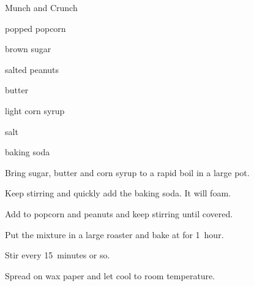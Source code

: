 \begin{recipe}{Munch and Crunch}{}{}

\begin{ingredients}
\item {}popped popcorn
\item {} brown sugar
\item \C{1 \half} salted peanuts
\item {} butter
\item \C{\half} light corn syrup
\item {} salt
\item \tp{\half} baking soda
\end{ingredients}

\begin{directions}
\item Bring sugar, butter and corn syrup to a rapid boil in a large pot.
\item Keep stirring and quickly add the baking soda. It will foam.
\item Add to popcorn and peanuts and keep stirring until covered.
\item Put the mixture in a large roaster and bake at  for 1~hour.
\item Stir every 15~minutes or so.
\item Spread on wax paper and let cool to room temperature.
\end{directions}
\end{recipe}
